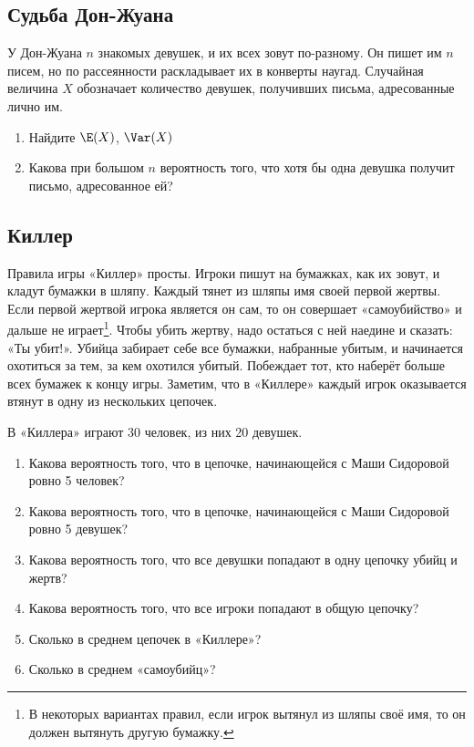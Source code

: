 \documentclass[10pt]{article}
\begin{document}
\subsection{Судьба Дон-Жуана} 

У Дон-Жуана $n$  знакомых девушек, и их всех зовут по-разному. Он пишет
им $n$  писем, но по рассеянности раскладывает их в конверты
наугад. Случайная величина $X$ обозначает количество девушек, получивших письма, адресованные лично им.

\begin{enumerate}
\item Найдите $\E(X)$, $\Var(X)$
\item Какова при большом $n$ вероятность того, что хотя бы одна девушка получит письмо, адресованное ей?
\end{enumerate}


\subsection{Киллер}

Правила игры «Киллер» просты. Игроки пишут на бумажках, как их зовут, и кладут бумажки в шляпу. Каждый тянет из шляпы имя своей первой жертвы. Если первой жертвой игрока является он сам, то он совершает «самоубийство» и дальше не играет\footnote{В некоторых вариантах правил, если игрок вытянул из шляпы своё имя, то он должен вытянуть другую бумажку.}. Чтобы убить жертву, надо остаться с ней наедине и сказать: «Ты убит!». Убийца забирает себе все бумажки, набранные убитым, и начинается охотиться за тем, за кем охотился убитый.  Побеждает тот, кто наберёт больше всех бумажек к концу игры. Заметим, что в «Киллере» каждый игрок оказывается втянут в одну из нескольких цепочек.

В «Киллера» играют 30 человек, из них 20 девушек. 

\begin{enumerate}
\item Какова вероятность того, что в цепочке, начинающейся с Маши Сидоровой ровно 5 человек?
\item Какова вероятность того, что в цепочке, начинающейся с Маши Сидоровой ровно 5 девушек?
\item Какова вероятность того, что все девушки попадают в одну цепочку убийц и жертв?
\item Какова вероятность того, что все игроки попадают в общую цепочку?
\item Сколько в среднем цепочек в «Киллере»?
\item Сколько в среднем «самоубийц»?
\end{enumerate}
\end{document}
